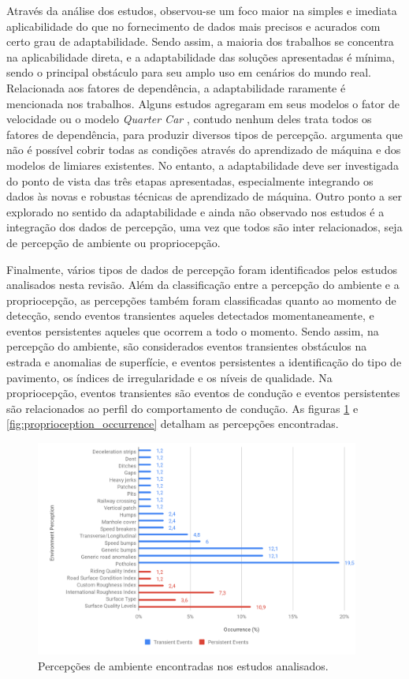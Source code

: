Através da análise dos estudos, observou-se um foco maior na simples e imediata aplicabilidade do que no fornecimento de dados mais precisos e acurados com certo grau de adaptabilidade. Sendo assim, a maioria dos trabalhos se concentra na aplicabilidade direta, e a adaptabilidade das soluções apresentadas é mínima, sendo o principal obstáculo para seu amplo uso em cenários do mundo real. Relacionada aos fatores de dependência, a adaptabilidade raramente é mencionada nos trabalhos. Alguns estudos agregaram em seus modelos o fator de velocidade ou o modelo \textit{Quarter Car} \cite{Tomiyama2016}, contudo nenhum deles trata todos os fatores de dependência, para produzir diversos tipos de percepção. \cite{Singh2017} argumenta que não é possível cobrir todas as condições através do aprendizado de máquina e dos modelos de limiares existentes. No entanto, a adaptabilidade deve ser investigada do ponto de vista das três etapas apresentadas, especialmente integrando os dados às novas e robustas técnicas de aprendizado de máquina. Outro ponto a ser explorado no sentido da adaptabilidade e ainda não observado nos estudos é a integração dos dados de percepção, uma vez que todos são inter relacionados, seja de percepção de ambiente ou propriocepção.

Finalmente, vários tipos de dados de percepção foram identificados pelos estudos analisados nesta revisão. Além da classificação entre a percepção do ambiente e a propriocepção, as percepções também foram classificadas quanto ao momento de detecção, sendo eventos transientes aqueles detectados momentaneamente, e eventos persistentes aqueles que ocorrem a todo o momento. Sendo assim, na percepção do ambiente, são considerados eventos transientes obstáculos na estrada e anomalias de superfície, e eventos persistentes a identificação do tipo de pavimento, os índices de irregularidade e os níveis de qualidade. Na propriocepção, eventos transientes são eventos de condução e eventos persistentes são relacionados ao perfil do comportamento de condução. As figuras \ref{fig:environment_perception_occurrence} e \ref{fig:proprioception_occurrence} detalham as percepções encontradas.

\begin{figure}[h!]
  \centering
  \caption{Percepções de ambiente encontradas nos estudos analisados.}
   \label{fig:environment_perception_occurrence}
   \includegraphics[width=0.95\textwidth]{figuras/fig3_4.png}
\end{figure}


